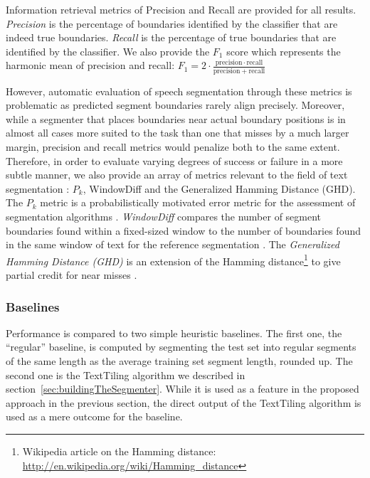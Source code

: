 Information retrieval metrics of Precision and Recall are provided for all results. \textit{Precision} is the percentage of boundaries identified by the classifier that are indeed true boundaries. \textit{Recall} is the percentage of true boundaries that are identified by the classifier. We also provide the $F_1$ score which represents the harmonic mean of precision and recall:
$  F_1 = 2 \cdot \frac{\mathrm{precision} \cdot \mathrm{recall}}{\mathrm{precision} + \mathrm{recall}}$

However, automatic evaluation of speech segmentation through these metrics is problematic as predicted segment boundaries rarely align precisely. Moreover, while a segmenter that places boundaries near actual boundary positions is in almost all cases more suited to the task than one that misses by a much larger margin, precision and recall metrics would penalize both to the same extent. Therefore, in order to evaluate varying degrees of success or failure in a more subtle manner, we also provide an array of metrics relevant to the field of text segmentation : ${P_{k}}$, WindowDiff and the Generalized Hamming Distance (GHD).
%
The ${P_{k}}$ metric is a probabilistically motivated error metric for the assessment of segmentation algorithms \cite{beeferman1999statistical}.
%
\textit{WindowDiff} compares the number of segment boundaries found within a fixed-sized window to the number of boundaries found in the same window of text for the reference segmentation \cite{pevzner2002critique}.
%
The \textit{Generalized Hamming Distance (GHD)} is an extension of the Hamming distance\footnote{Wikipedia article on the Hamming distance: \url{http://en.wikipedia.org/wiki/Hamming_distance}} to give partial credit for near misses \cite{bookstein2002generalized}.
\subsubsection{Baselines}

Performance is compared to two simple heuristic baselines. The first one, the ``regular'' baseline, is computed by segmenting the test set into regular segments of the same length as the average training set segment length, rounded up. The second one is the TextTiling algorithm we described in section~\ref{sec:buildingTheSegmenter}.
While it is used as a feature in the proposed approach in the previous section, the direct output of the TextTiling algorithm is used as a mere outcome for the baseline.
